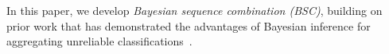 In this paper, we develop \emph{Bayesian sequence combination (BSC)}, 
building on prior work that has demonstrated the advantages of Bayesian inference for aggregating unreliable classifications~\cite{kim2012bayesian,simpsonlong,Felt2016SemanticAA,paun2018comparing}.
%
